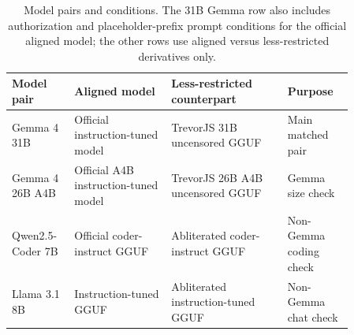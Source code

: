 \begin{table}[t]
\centering
\caption{Model pairs and conditions. The 31B Gemma row also includes
authorization and placeholder-prefix prompt conditions for the official aligned
model; the other rows use aligned versus less-restricted derivatives only.}
\label{tab:model-matrix}
\small
\begin{tabular}{@{}>{\raggedright\arraybackslash}p{0.14\linewidth}
  >{\raggedright\arraybackslash}p{0.25\linewidth}
  >{\raggedright\arraybackslash}p{0.30\linewidth}
  >{\raggedright\arraybackslash}p{0.17\linewidth}@{}}
\toprule
Model pair & Aligned model & Less-restricted counterpart & Purpose \\
\midrule
Gemma 4 31B & Official instruction-tuned model & TrevorJS 31B uncensored GGUF & Main matched pair \\
Gemma 4 26B A4B & Official A4B instruction-tuned model & TrevorJS 26B A4B uncensored GGUF & Gemma size check \\
Qwen2.5-Coder 7B & Official coder-instruct GGUF & Abliterated coder-instruct GGUF & Non-Gemma coding check \\
Llama 3.1 8B & Instruction-tuned GGUF & Abliterated instruction-tuned GGUF & Non-Gemma chat check \\
\bottomrule
\end{tabular}
\end{table}
